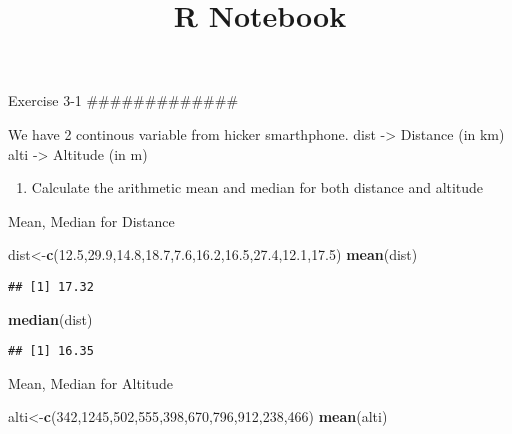 \documentclass[
]{article}
\title{R Notebook}
\author{}
\date{\vspace{-2.5em}}
\newenvironment{Shaded}{\begin{snugshade}}{\end{snugshade}}
\newcommand{\DecValTok}[1]{\textcolor[rgb]{0.00,0.00,0.81}{#1}}
\newcommand{\FloatTok}[1]{\textcolor[rgb]{0.00,0.00,0.81}{#1}}
\newcommand{\KeywordTok}[1]{\textcolor[rgb]{0.13,0.29,0.53}{\textbf{#1}}}
\newcommand{\NormalTok}[1]{#1}
\providecommand{\tightlist}{%
  \setlength{\itemsep}{0pt}\setlength{\parskip}{0pt}}
\begin{document}
\maketitle

Exercise 3-1 \#\#\#\#\#\#\#\#\#\#\#\#\#

We have 2 continous variable from hicker smarthphone. dist
-\textgreater{} Distance (in km) alti -\textgreater{} Altitude (in m)

\begin{enumerate}
\def\labelenumi{\alph{enumi})}
\tightlist
\item
  Calculate the arithmetic mean and median for both distance and
  altitude
\end{enumerate}

Mean, Median for Distance

\begin{Shaded}
\begin{Highlighting}[]
\NormalTok{dist<-}\KeywordTok{c}\NormalTok{(}\FloatTok{12.5}\NormalTok{,}\FloatTok{29.9}\NormalTok{,}\FloatTok{14.8}\NormalTok{,}\FloatTok{18.7}\NormalTok{,}\FloatTok{7.6}\NormalTok{,}\FloatTok{16.2}\NormalTok{,}\FloatTok{16.5}\NormalTok{,}\FloatTok{27.4}\NormalTok{,}\FloatTok{12.1}\NormalTok{,}\FloatTok{17.5}\NormalTok{)}
\KeywordTok{mean}\NormalTok{(dist)}
\end{Highlighting}
\end{Shaded}

\begin{verbatim}
## [1] 17.32
\end{verbatim}

\begin{Shaded}
\begin{Highlighting}[]
\KeywordTok{median}\NormalTok{(dist)}
\end{Highlighting}
\end{Shaded}

\begin{verbatim}
## [1] 16.35
\end{verbatim}

Mean, Median for Altitude

\begin{Shaded}
\begin{Highlighting}[]
\NormalTok{alti<-}\KeywordTok{c}\NormalTok{(}\DecValTok{342}\NormalTok{,}\DecValTok{1245}\NormalTok{,}\DecValTok{502}\NormalTok{,}\DecValTok{555}\NormalTok{,}\DecValTok{398}\NormalTok{,}\DecValTok{670}\NormalTok{,}\DecValTok{796}\NormalTok{,}\DecValTok{912}\NormalTok{,}\DecValTok{238}\NormalTok{,}\DecValTok{466}\NormalTok{)}
\KeywordTok{mean}\NormalTok{(alti)}
\end{Highlighting}
\end{Shaded}
\end{document}
